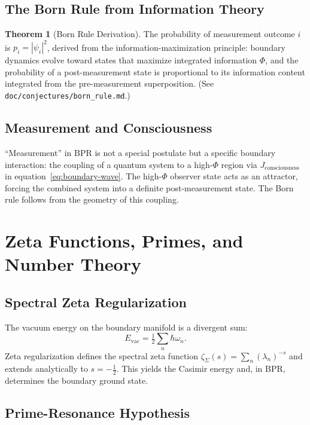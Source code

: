 \documentclass[12pt,oneside]{book}
\theoremstyle{definition}
\newtheorem{theorem}{Theorem}[chapter]
\begin{document}
\section{The Born Rule from Information Theory}

\begin{theorem}[Born Rule Derivation]
  The probability of measurement outcome $i$ is
  $p_i = |\psi_i|^2$, derived from the information-maximization principle:
  boundary dynamics evolve toward states that maximize integrated information
  $\Phi$, and the probability of a post-measurement state is proportional to
  its information content integrated from the pre-measurement superposition.
  (See \texttt{doc/conjectures/born\_rule.md}.)
\end{theorem}

\section{Measurement and Consciousness}

``Measurement'' in BPR is not a special postulate but a specific boundary
interaction: the coupling of a quantum system to a high-$\Phi$ region via
$J_{\mathrm{consciousness}}$ in equation~\eqref{eq:boundary-wave}. The high-$\Phi$
observer state acts as an attractor, forcing the combined system into a definite
post-measurement state. The Born rule follows from the geometry of this coupling.

\chapter{Zeta Functions, Primes, and Number Theory}
\label{chap:zeta}

\section{Spectral Zeta Regularization}

The vacuum energy on the boundary manifold is a divergent sum:
\begin{equation}
  E_{\mathrm{vac}} = \tfrac{1}{2}\sum_n\hbar\omega_n.
\end{equation}
Zeta regularization defines the spectral zeta function
$\zeta_\Sigma(s) = \sum_n (\lambda_n)^{-s}$ and extends analytically to
$s = -\tfrac{1}{2}$. This yields the Casimir energy and, in BPR, determines the
boundary ground state.

\section{Prime-Resonance Hypothesis}
\end{document}
